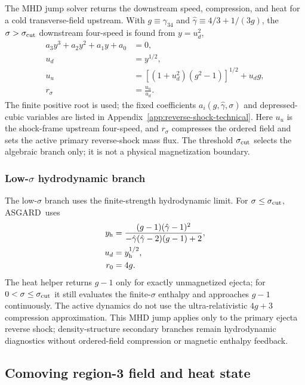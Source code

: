 \documentclass[twocolumn]{aastex702}
\newcommand{\asgard}{\textsc{ASGARD}}
\begin{document}
The MHD jump solver returns the downstream speed, compression, and heat for a
cold transverse-field upstream.  With \(g\equiv\gamma_{34}\) and
\(\hat{\gamma}\equiv4/3+1/(3g)\), the \(\sigma>\sigma_{\rm cut}\) downstream
four-speed is found from \(y=u_d^2\),
\begin{equation}
\begin{aligned}
a_3y^3+a_2y^2+a_1y+a_0&=0,\\
u_d&=y^{1/2},\\
u_u&=\left[(1+u_d^2)(g^2-1)\right]^{1/2}+u_dg,\\
r_\sigma&=\frac{u_u}{u_d}.
\end{aligned}
\end{equation}
The finite positive root is used; the fixed coefficients
\(a_i(g,\hat{\gamma},\sigma)\) and depressed-cubic variables are listed in
Appendix~\ref{app:reverse-shock-technical}.  Here \(u_u\) is the shock-frame
upstream four-speed, and \(r_\sigma\) compresses the ordered field and sets the
active primary reverse-shock mass flux.  The threshold \(\sigma_{\rm cut}\)
selects the algebraic branch only; it is not a physical magnetization boundary.

\subsubsection{\texorpdfstring{Low-\(\sigma\)}{Low-sigma} hydrodynamic branch}

The low-\(\sigma\) branch uses the finite-strength hydrodynamic limit.  For
\(\sigma\le\sigma_{\rm cut}\), \asgard\ uses
\begin{equation}
\begin{aligned}
y_{\rm h}&=
\frac{(g-1)(\hat{\gamma}-1)^2}
{-\hat{\gamma}(\hat{\gamma}-2)(g-1)+2},\\
u_d&=y_{\rm h}^{1/2},\\
r_0&=4g .
\end{aligned}
\end{equation}
The heat helper returns \(g-1\) only for exactly unmagnetized ejecta; for
\(0<\sigma\le\sigma_{\rm cut}\) it still evaluates the finite-\(\sigma\) enthalpy
and approaches \(g-1\) continuously.  The active dynamics do not use the
ultra-relativistic \(4g+3\) compression approximation.  This MHD jump applies only
to the primary ejecta reverse shock; density-structure secondary branches remain
hydrodynamic diagnostics without ordered-field compression or magnetic enthalpy
feedback.

\subsection{Comoving region-3 field and heat state}
\end{document}
